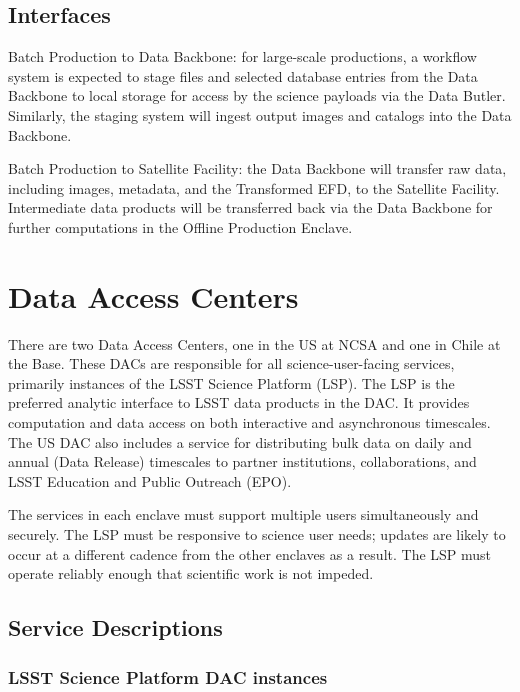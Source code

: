 \documentclass[DM,toc,lsstdraft]{lsstdoc}
\begin{document}
\subsection{Interfaces}\label{ncsa-general-production-interfaces}

Batch Production to Data Backbone: for large-scale productions, a workflow
system is expected to stage files and selected database entries from the
Data Backbone to local storage for access by the science payloads via
the Data Butler. Similarly, the staging system will ingest output images
and catalogs into the Data Backbone.

Batch Production to Satellite Facility: the Data Backbone will transfer raw data, including images, metadata, and the Transformed EFD, to the Satellite Facility.
Intermediate data products will be transferred back via the Data Backbone for further computations in the Offline Production Enclave.

\section{Data Access Centers}\label{data-access-centers}

There are two Data Access Centers, one in the US at NCSA and one in
Chile at the Base. These DACs are responsible for all
science-user-facing services, primarily instances of the LSST Science
Platform (LSP). The LSP is the preferred analytic interface to LSST data
products in the DAC. It provides computation and data access on both
interactive and asynchronous timescales. The US DAC also includes a
service for distributing bulk data on daily and annual (Data Release)
timescales to partner institutions, collaborations, and LSST Education
and Public Outreach (EPO).

The services in each enclave must support multiple users simultaneously
and securely. The LSP must be responsive to science user needs; updates
are likely to occur at a different cadence from the other enclaves as a
result. The LSP must operate reliably enough that scientific work is not
impeded.

\subsection{Service Descriptions}\label{dac-service-descriptions}

\subsubsection{LSST Science Platform DAC
instances}\label{lsst-science-platform-dac-instances}
\end{document}
